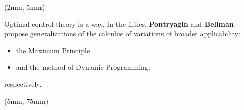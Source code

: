 {%
\begin{frame}{}
    \begin{textblock*}{55mm}(2mm, 5mm)
        \begin{beamerboxesrounded}{Optimal control theory is a way.}
                In the fifties, \textbf{Pontryagin} and
            \textbf{Bellman} propose generalizations of the calculus
            of variations of broader applicability:
            \begin{itemize}
                \item
                    the Maximum Principle
                \item
                    and the method of Dynamic Programming,
            \end{itemize}
            respectively.
        \end{beamerboxesrounded}
    \end{textblock*}
%
    \begin{textblock*}{120mm}(5mm, 75mm)
        \begin{beamerboxesrounded}{}
            \begin{bibunit}[apalike]
                \nocite{lenhart2007optimal}
                \putbib
            \end{bibunit}
        \end{beamerboxesrounded}
    \end{textblock*}
\end{frame}
}
